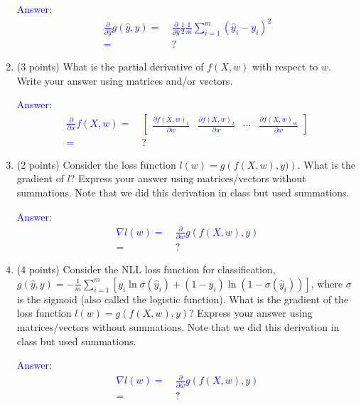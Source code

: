 \documentclass{article}
\begin{document}
\begin{enumerate}
    \textcolor{blue}{Answer: 
    \begin{align}
        \frac{\partial }{\partial \hat y}g(\hat y, y) = &\ \frac{\partial }{\partial \hat y} \frac{1}{2}\frac{1}{m} \sum_{i = 1}^m \left (\hat y_i - y_i \right )^2 \\
        = &\  ?
    \end{align}
    }
    \item (3 points) What is the partial derivative of $f(X,w)$ with respect to $w$. Write your answer using matrices and/or vectors. 
    
    \textcolor{blue}{Answer: 
    \begin{align}
        \frac{\partial}{\partial w}f(X,w)  
        = &\ \begin{bmatrix}
            \frac{\partial f(X,w)_1}{\partial w} & \frac{\partial f(X,w)_2}{\partial w} & \cdots & \frac{\partial f(X,w)_m}{\partial w}
        \end{bmatrix} \\
        = &\ ?
    \end{align}
    }
    \item (2 points) Consider the loss function $l(w) = g\left (f(X,w),y) \right )$. What is the gradient of $l$? Express your answer using matrices/vectors without summations. Note that we did this derivation in class but used summations. 
    
    \textcolor{blue}{Answer: 
    \begin{align}
        \nabla l(w) = &\ \frac{\partial }{\partial w}g\left (f(X,w),y \right ) \\
        = &\ ?
    \end{align}
    }
    \item (4 points) Consider the NLL loss function for classification, 
    $g(\hat y, y) = -\frac{1}{m} \sum_{i=1}^m \left [y_i\ln \sigma (\hat y_i) + (1-y_i)\ln \left (1 - \sigma(\hat y_i) \right ) \right ]$, where $\sigma$ is the sigmoid (also called the logistic function). What is the gradient of the loss function $l(w) = g\left (f(X,w),y \right )$? Express your answer using matrices/vectors without summations. Note that we did this derivation in class but used summations. 

    \textcolor{blue}{Answer: 
    \begin{align}
        \nabla l(w) = &\ \frac{\partial }{\partial w}g\left (f(X,w),y \right ) \\
        = &\ ?
    \end{align}
    }
\end{enumerate}
\end{document}
